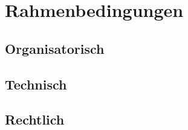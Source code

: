 \chapter{Rahmenbedingungen}\label{sec:rahmen}
\section{Organisatorisch}
 
\section{Technisch}

\section{Rechtlich}